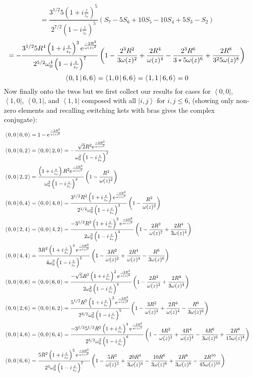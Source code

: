 \documentclass[11pt]{amsart}
\makeatletter
\newcommand{\e}{{\rm e}}				%
\newcommand{\msp}[1]{\mspace{#1mu}}		%
\newcommand{\0}{\varnothing}		%
\newcommand{\ket}[1]{\left \lvert #1\right \rangle}	%
\newcommand{\bra}[1]{\left \langle #1 \right \rvert}	%
\newcommand{\brac}[2]{\left\langle\msp{2} #1\left\lvert \msp{3.5} #2 \right.\right\rangle}	%
\newcommand{\1}{!}
\newcommand{\2}{@}
\newcommand{\3}{\#}
\newcommand{\4}{\$}
\newcommand{\5}{\%}
\newcommand{\6}{$^\wedge$}
\newcommand{\7}{\&}
\newcommand{\8}{*}
\newcommand{\9}{(}
\makeatother
\begin{document}
\[
=\frac{3^{1/2}5\left(1+i\frac{z}{z_r}\right)^5}{2^{7/2}\left(1-i\frac{z}{z_r}\right)^5}\left(S_7-5S_6+10S_5-10S_4+5S_3-S_2\right)
\]
\[
=-\frac{3^{1/2}5R^4\left(1+i\frac{z}{z_r}\right)^3\e^{\frac{-2R^2}{\omega(z)^2}}}{2^{5/2}\omega_0^4\left(1-i\frac{z}{z_r}\right)^7}\left(1-\frac{2^3R^2}{3\omega(z)^2}+\frac{2R^4}{\omega(z)^4}-\frac{2^3R^6}{3*5\omega(z)^6}+\frac{2R^8}{3^25\omega(z)^8}\right)
\]
\[
\brac{0,1}{6,6} = \brac{1,0}{6,6} = \brac{1,1}{6,6} = 0
\]\newpage
Now finally onto the twos but we first collect our results for cases for $\bra{0,0}$, $\bra{1,0}$, $\bra{0,1}$, and $\bra{1,1}$ composed with all $\ket{i,j}$ for $i,j\le 6$, (showing only non-zero elements and recalling switching kets with bras gives the complex conjugate):
\begin{align*}
&\brac{0,0}{0,0} = 1-\e^{\frac{-2R^2}{\omega(z)^2}}
\\
&\brac{0,0}{0,2} = \brac{0,0}{2,0} = -\frac{\sqrt{2}R^2\e^{\frac{-2R^2}{\omega(z)^2}}}{\omega_0^2\left(1-i\frac{z}{z_r}\right)^2}
\\
&\brac{0,0}{2,2} = \frac{\left(1+i\frac{z}{z_r}\right)R^2\e^{\frac{-2R^2}{\omega(z)^2}}}{\omega_0^2\left(1-i\frac{z}{z_r}\right)^3}\left(1-\frac{R^2}{\omega(z)^2}\right)
\\
&\brac{0,0}{0,4} = \brac{0,0}{4,0} = \frac{3^{1/2}R^2\left(1+i\frac{z}{z_r}\right)\e^{\frac{-2R^2}{\omega(z)^2}}}{2^{1/2}\omega_0^2\left(1-i\frac{z}{z_r}\right)^3}\left(1-\frac{R^2}{\omega(z)^2}\right)
\\
&\brac{0,0}{2,4} = \brac{0,0}{4,2} = \frac{-3^{1/2}R^2\left(1+i\frac{z}{z_r}\right)^2\e^{\frac{-2R^2}{\omega(z)^2}}}{2\omega_0^2\left(1-i\frac{z}{z_r}\right)^4}\left(1-\frac{2R^2}{\omega(z)^2}+\frac{2R^4}{3\omega(z)^4}\right)
\\
&
\brac{0,0}{4,4} = \frac{3R^2\left(1+i\frac{z}{z_r}\right)^3\e^{\frac{-2R^2}{\omega(z)^2}}}{4\omega_0^2\left(1-i\frac{z}{z_r}\right)^5}\left(1-\frac{3R^2}{\omega(z)^2}+\frac{2R^4}{\omega(z)^4}-\frac{R^6}{3\omega(z)^6}\right)
\\
&
\brac{0,0}{0,6} = \brac{0,0}{6,0} =   \frac{-\sqrt{5}R^2\left(1+i\frac{z}{z_r}\right)^2\e^{\frac{-2R^2}{\omega(z)^2}}}{2\omega_0^2\left(1-i\frac{z}{z_r}\right)^4}\left(1-\frac{2R^2}{\omega(z)^2}+\frac{2R^4}{3\omega(z)^4}\right) 
\\
&
\brac{0,0}{2,6} = \brac{0,0}{6,2} = \frac{5^{1/2}R^2\left(1+i\frac{z}{z_r}\right)^3\e^{\frac{-2R^2}{\omega(z)^2}}}{2^{3/2}\omega_0^2\left(1-i\frac{z}{z_r}\right)^5}\left(1-\frac{3R^2}{\omega(z)^2}+\frac{2R^4}{\omega(z)^4}-\frac{R^6}{3\omega(z)^6}\right)
\\
&
\brac{0,0}{4,6} = \brac{0,0}{6,4} =\frac{-3^{1/2}5^{1/2}R^2\left(1+i\frac{z}{z_r}\right)^4\e^{\frac{-2R^2}{\omega(z)^2}}}{2^{5/2}\omega_0^2\left(1-i\frac{z}{z_r}\right)^6}\left(1-\frac{4R^2}{\omega(z)^2}+\frac{4R^4}{\omega(z)^4}-\frac{4R^6}{3\omega(z)^6}+\frac{2R^8}{15\omega(z)^8}\right)
\\
&
\brac{0,0}{6,6} = \frac{5R^2\left(1+i\frac{z}{z_r}\right)^5\e^{\frac{-2R^2}{\omega(z)^2}}}{2^3\omega_0^2\left(1-i\frac{z}{z_r}\right)^7}\left(1-\frac{5R^2}{\omega(z)^2}+\frac{20R^4}{3\omega(z)^4}-\frac{10R^6}{3\omega(z)^6}+\frac{2R^8}{3\omega(z)^8}-\frac{2R^{10}}{45\omega(z)^{10}}\right)
\end{align*}
\end{document}
